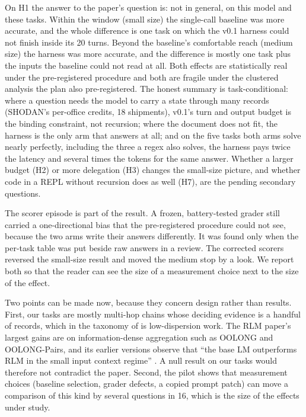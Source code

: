 \documentclass[11pt]{article}
\begin{document}
On H1 the answer to the paper's question is: not in general, on this model and these
tasks. Within the window (small size) the single-call baseline was more accurate, and
the whole difference is one task on which the v0.1 harness could not finish inside its
20 turns. Beyond the baseline's comfortable reach (medium size) the harness was more
accurate, and the difference is mostly one task plus the inputs the baseline could not
read at all. Both effects are statistically real under the pre-registered procedure and
both are fragile under the clustered analysis the plan also pre-registered. The honest
summary is task-conditional: where a question needs the model to carry a state through
many records (SHODAN's per-office credits, 18 shipments), v0.1's turn and output budget
is the binding constraint, not recursion; where the document does not fit, the harness
is the only arm that answers at all; and on the five tasks both arms solve nearly
perfectly, including the three a regex also solves, the harness pays twice the latency
and several times the tokens for the same answer. Whether a larger budget (H2) or more
delegation (H3) changes the small-size picture, and whether code in a REPL without
recursion does as well (H7), are the pending secondary questions.

The scorer episode is part of the result. A frozen, battery-tested grader still carried
a one-directional bias that the pre-registered procedure could not see, because the two
arms write their answers differently. It was found only when the per-task table was put
beside raw answers in a review. The corrected scorers reversed the small-size result and
moved the medium stop by a look. We report both so that the reader can see the size of a
measurement choice next to the size of the effect.

Two points can be made now, because they concern design rather than results. First,
our tasks are mostly multi-hop chains whose deciding evidence is a handful of
records, which in the taxonomy of \citet{goldman2025retrieval} is low-dispersion
work. The RLM paper's largest gains are on information-dense aggregation such as
OOLONG and OOLONG-Pairs, and its earlier versions observe that ``the base LM
outperforms RLM in the small input context regime''
\citep[v2, \S4]{zhang2025rlm}. A null result on our tasks would therefore not contradict the paper.
Second, the pilot shows that measurement choices (baseline selection, grader
defects, a copied prompt patch) can move a comparison of this kind by several
questions in 16, which is the size of the effects under study.
\end{document}
